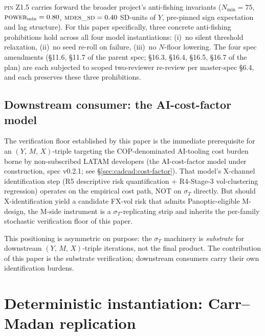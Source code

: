\documentclass[11pt,letterpaper]{article}
\newcommand{\sigmaT}{\sigma_{T}}
\newcommand{\Ymx}{(Y,\,M,\,X)}
\newcommand{\PinZ}[1]{\textsc{pin Z1.#1}}
\begin{document}
\PinZ{5} carries forward the broader project's anti-fishing invariants
($N_{\min} = 75$, $\textsc{power}_{\min} = 0.80$,
$\textsc{mdes\_sd} = 0.40$ SD-units of $Y$, pre-pinned sign expectation
and lag structure). For this paper specifically, three concrete
anti-fishing prohibitions hold across all four model instantiations:
(i)~no silent threshold relaxation, (ii)~no seed re-roll on failure,
(iii)~no $N$-floor lowering. The four spec amendments
(\S11.6, \S11.7 of the parent spec; \S16.3, \S16.4, \S16.5, \S16.7 of
the plan) are each subjected to scoped two-reviewer re-review per
\textsf{master-spec} \S6.4, and each preserves these three prohibitions.

\subsection{Downstream consumer: the AI-cost-factor model}
\label{sec:framework:downstream}

The verification floor established by this paper is the immediate
prerequisite for an \(\Ymx\)-triple targeting the COP-denominated AI-tooling
cost burden borne by non-subscribed LATAM developers (the AI-cost-factor
model under construction, spec v0.2.1; see
\S\ref{sec:cadcad:cost-factor}). That model's X-channel identification
step (R5 descriptive risk quantification + R4-Stage-3 vol-clustering
regression) operates on the empirical cost path, NOT on $\sigmaT$
directly. But should X-identification yield a candidate FX-vol risk
that admits Panoptic-eligible M-design, the M-side instrument is a
$\sigmaT$-replicating strip and inherits the per-family stochastic
verification floor of this paper.

This positioning is asymmetric on purpose: the $\sigmaT$ machinery is
\emph{substrate} for downstream \(\Ymx\)-triple iterations, not the
final product. The contribution of this paper is the substrate
verification; downstream consumers carry their own identification
burdens.

\section{Deterministic instantiation: Carr--Madan replication}
\label{sec:deterministic}

\end{document}
